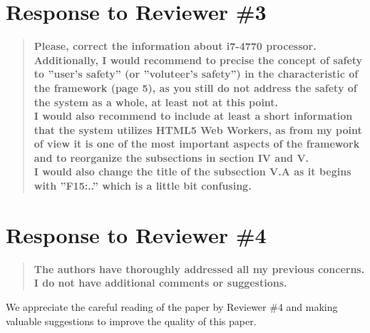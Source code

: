 \documentclass[preprint]{elsarticle}
\begin{document}
\section{Response to Reviewer \#3}


\begin{quote}
\textbf{Please, correct the information about i7-4770 processor. Additionally, I would recommend to precise the concept of safety to ''user's safety'' (or ''voluteer's safety'') in the characteristic of the framework (page 5), as you still do not address the safety of the system as a whole, at least not at this point.\\
I would also recommend to include at least a short information that the system utilizes HTML5 Web Workers, as from my point of view it is one of the most important aspects of the framework and to reorganize the subsections in section IV and V. \\
I would also change the title of the subsection V.A as it begins with ''F15:..'' which is a little bit confusing.}
\end{quote}



\section{Response to Reviewer \#4}

\begin{quote}\textbf{
The authors have thoroughly addressed all my previous concerns. I do not have additional comments or suggestions.
}\end{quote}

We appreciate the careful reading of the paper by Reviewer \#4 and making valuable suggestions to improve the quality of this paper.




\end{document}
